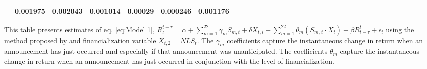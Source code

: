 \begin{sidewaystable}
{\begin{tabular}{@{}lllllllllllll@{}}
 &\multicolumn{2}{c}{ 0.001975 }                                                 & \multicolumn{2}{c}{ 0.002043 }                                                 & \multicolumn{2}{c}{ 0.001014 }                                                 & \multicolumn{2}{c}{ 0.00029 }                                                 & \multicolumn{2}{c}{ 0.000246 }                                                   & \multicolumn{2}{c}{ 0.001176 }                                                 \\ \bottomrule 
\end{tabular}
}
\begin{tablenotes}\item 
    \singlespacing
    \footnotesize
    This table presents estimates of eq. \ref{eq:Model 1}, $R_{t}^{t+\tau}=\alpha+\sum_{m=1}^{22} \gamma_m S_{m,t}+ \delta X_{t,i} + \sum_{m=1}^{22} \theta_m (S_{m,t} \cdot X_t)+\beta R_{t-\tau}^{t}+\epsilon_{t}$ using the method proposed by \citet{kurov2019price} and financialization variable $X_{t,2}=NLS_t$. The $\gamma_m$ coefficients capture the instantaneous change in return when an announcement has just occurred and especially if that announcement was unanticipated. The coefficients $\theta_m$ capture the instantaneous change in return when an announcement has just occurred in conjunction with the level of financialization.
\end{tablenotes}
\end{sidewaystable}



